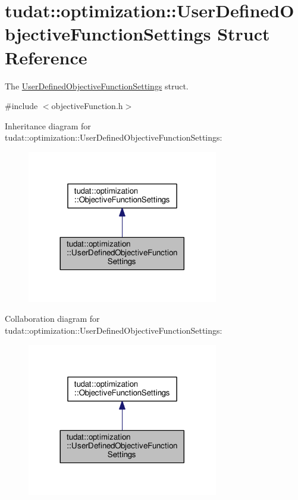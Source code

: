 \hypertarget{structtudat_1_1optimization_1_1UserDefinedObjectiveFunctionSettings}{}\section{tudat\+:\+:optimization\+:\+:User\+Defined\+Objective\+Function\+Settings Struct Reference}
\label{structtudat_1_1optimization_1_1UserDefinedObjectiveFunctionSettings}


The \hyperlink{structtudat_1_1optimization_1_1UserDefinedObjectiveFunctionSettings}{User\+Defined\+Objective\+Function\+Settings} struct.  




{\ttfamily \#include $<$objective\+Function.\+h$>$}



Inheritance diagram for tudat\+:\+:optimization\+:\+:User\+Defined\+Objective\+Function\+Settings\+:
\nopagebreak
\begin{figure}[H]
\begin{center}
\leavevmode
\includegraphics[width=236pt]{structtudat_1_1optimization_1_1UserDefinedObjectiveFunctionSettings__inherit__graph}
\end{center}
\end{figure}


Collaboration diagram for tudat\+:\+:optimization\+:\+:User\+Defined\+Objective\+Function\+Settings\+:
\nopagebreak
\begin{figure}[H]
\begin{center}
\leavevmode
\includegraphics[width=236pt]{structtudat_1_1optimization_1_1UserDefinedObjectiveFunctionSettings__coll__graph}
\end{center}
\end{figure}
